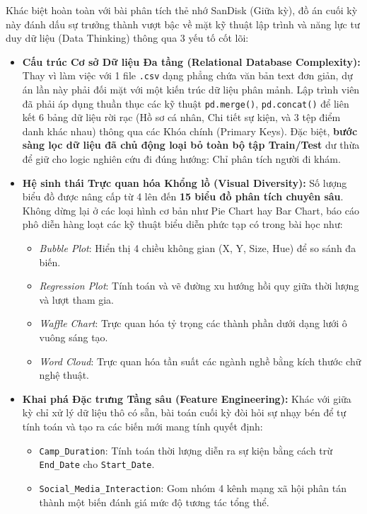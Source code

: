 \documentclass[12pt,a4paper]{article}
\begin{document}
Khác biệt hoàn toàn với bài phân tích thẻ nhớ SanDisk (Giữa kỳ), đồ án cuối kỳ này đánh dấu sự trưởng thành vượt bậc về mặt kỹ thuật lập trình và năng lực tư duy dữ liệu (Data Thinking) thông qua 3 yếu tố cốt lõi:

\begin{itemize}
    \item \textbf{Cấu trúc Cơ sở Dữ liệu Đa tầng (Relational Database Complexity):} Thay vì làm việc với 1 file \texttt{.csv} dạng phẳng chứa văn bản text đơn giản, dự án lần này phải đối mặt với một kiến trúc dữ liệu phân mảnh. Lập trình viên đã phải áp dụng thuần thục các kỹ thuật \texttt{pd.merge()}, \texttt{pd.concat()} để liên kết 6 bảng dữ liệu rời rạc (Hồ sơ cá nhân, Chi tiết sự kiện, và 3 tệp điểm danh khác nhau) thông qua các Khóa chính (Primary Keys). Đặc biệt, \textbf{bước sàng lọc dữ liệu đã chủ động loại bỏ toàn bộ tập Train/Test} dư thừa để giữ cho logic nghiên cứu đi đúng hướng: Chỉ phân tích người đi khám.
    \item \textbf{Hệ sinh thái Trực quan hóa Khổng lồ (Visual Diversity):} Số lượng biểu đồ được nâng cấp từ 4 lên đến \textbf{15 biểu đồ phân tích chuyên sâu}. Không dừng lại ở các loại hình cơ bản như Pie Chart hay Bar Chart, báo cáo phô diễn hàng loạt các kỹ thuật biểu diễn phức tạp có trong bài học như:
    \begin{itemize}
        \item \textit{Bubble Plot}: Hiển thị 4 chiều không gian (X, Y, Size, Hue) để so sánh đa biến.
        \item \textit{Regression Plot}: Tính toán và vẽ đường xu hướng hồi quy giữa thời lượng và lượt tham gia.
        \item \textit{Waffle Chart}: Trực quan hóa tỷ trọng các thành phần dưới dạng lưới ô vuông sáng tạo.
        \item \textit{Word Cloud}: Trực quan hóa tần suất các ngành nghề bằng kích thước chữ nghệ thuật.
    \end{itemize}
    \item \textbf{Khai phá Đặc trưng Tầng sâu (Feature Engineering):} Khác với giữa kỳ chỉ xử lý dữ liệu thô có sẵn, bài toán cuối kỳ đòi hỏi sự nhạy bén để tự tính toán và tạo ra các biến mới mang tính quyết định:
    \begin{itemize}
        \item \texttt{Camp\_Duration}: Tính toán thời lượng diễn ra sự kiện bằng cách trừ \texttt{End\_Date} cho \texttt{Start\_Date}.
        \item \texttt{Social\_Media\_Interaction}: Gom nhóm 4 kênh mạng xã hội phân tán thành một biến đánh giá mức độ tương tác tổng thể.
    \end{itemize}
\end{itemize}
\end{document}
